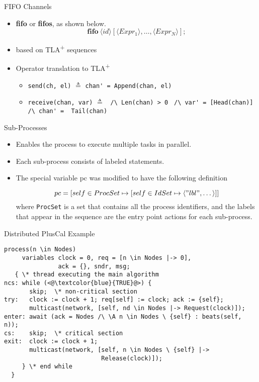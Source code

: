 \documentclass{beamer}
\newcommand\tab[1][1cm]{\hspace*{#1}}
\newcommand{\tlaplus}{TLA\textsuperscript{+}\xspace}
\newcommand{\seq}[1]{\langle #1 \rangle}
\newcommand{\keyword}[1]{\textbf{#1}}
\newcommand{\entity}[1]{\ensuremath{\langle}#1\ensuremath{\rangle}}
\begin{document}
\begin{frame}[fragile]{FIFO Channels}
    \begin{itemize}
        \item \keyword{fifo} or \keyword{fifos}, as shown below.
        \[
            \keyword{fifo}\ \entity{id}[\entity{Expr_1},\dots,\entity{Expr_N}];
        \]
         \item based on \tlaplus sequences
     \item Operator translation to \tlaplus

            \begin{itemize}
                \item \verb|send(ch, el)| $\triangleq$
                \verb|chan' = Append(chan, el)| 
                \newline
                \item \verb|receive(chan, var)| $\triangleq$
                      \verb| /\ Len(chan) > 0 | \newline \tab\tab\tab\tab
                         \verb|/\ var' = [Head(chan)]|\newline \tab\tab\tab\tab
                         \verb|/\ chan' =  Tail(chan)|
            \end{itemize}
    \end{itemize}
\end{frame}

\begin{frame}[fragile]{Sub-Processes}
    \begin{itemize}
     \item Enables the process to execute multiple tasks in parallel.
     \item Each sub-process consists of labeled statements.
     \item The special variable pc was modified to have the following definition

\[
pc = [self \in ProcSet \mapsto [self \in IdSet \mapsto \seq{"lbl",\dots}]]
\]	
    where \verb|ProcSet| is a set that contains all the process identifiers, and the labels that appear in the sequence are the entry point actions for each sub-process.

    \end{itemize}
\end{frame}

\begin{frame}[fragile]{Distributed PlusCal Example}
 \begin{lstlisting}[language=pluscal, frame = tlrb, numbers=none]  
 process(n \in Nodes)
     variables clock = 0, req = [n \in Nodes |-> 0],
               ack = {}, sndr, msg;
   { \* thread executing the main algorithm
ncs: while (<@\textcolor{blue}{TRUE}@>) {
       skip;  \* non-critical section
try:   clock := clock + 1; req[self] := clock; ack := {self};
       multicast(network, [self, nd \in Nodes |-> Request(clock)]);
enter: await (ack = Nodes /\ \A n \in Nodes \ {self} : beats(self, n));
cs:    skip;  \* critical section
exit:  clock := clock + 1;
       multicast(network, [self, n \in Nodes \ {self} |->
                           Release(clock)]);
     } \* end while
  } 
\end{lstlisting}
\end{frame}
\end{document}
